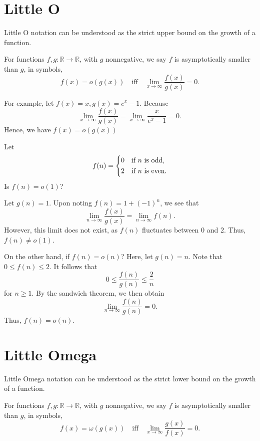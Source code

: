 \section{Little O}
Little O notation can be understood as the strict upper bound on the growth of a function.

\begin{definition}
    For functions \(f, g: \mathbb{R} \to \mathbb{R}\), with \(g\) nonnegative, we say \(f\) is asymptotically smaller than \(g\), in symbols,
    \[
        f(x) = o(g(x))\quad\text{iff}\quad\lim_{x \to \infty} \dfrac{f(x)}{g(x)} = 0. 
    \]
\end{definition}

\begin{eg}
    For example, let \(f(x) = x, g(x) = e^x - 1\). Because 
    \[
        \lim_{x \to \infty} \dfrac{f(x)}{g(x)} = \lim_{x \to \infty} \dfrac{x}{e^x - 1} = 0.
    \]
    Hence, we have \(f(x) = o(g(x))\) 
\end{eg}
\newpage
\begin{eg}
Let
\[
    f(n) = \begin{dcases}
        0\quad \text{if \(n\) is odd},\\
        2\quad \text{if \(n\) is even}.
    \end{dcases}
\]
Is \(f(n) = o(1)\)?

Let \(g(n) = 1\). Upon noting \(f(n) = 1 + (-1)^n\), we see that
\[
    \lim_{n \to \infty} \dfrac{f(x)}{g(x)} = \lim_{n \to \infty} f(n).
\] 
However, this limit does not exist, as \(f(n)\) fluctuates between 0 and 2. Thus, \(f(n) \neq o(1)\).

On the other hand, if \(f(n) = o(n)\)? Here, let \(g(n) = n\). Note that \(0 \leq f(n) \leq 2\). It follows that 
\[
    0 \leq \dfrac{f(n)}{g(n)} \leq \dfrac{2}{n}
\]
for \(n \geq 1\). By the sandwich theorem, we then obtain
\[
    \lim_{n \to \infty} \dfrac{f(n)}{g(n)} = 0.
\] 
Thus, \(f(n) = o(n)\).
\end{eg}

\section{Little Omega}
Little Omega notation can be understood as the strict lower bound on the growth of a function.

\begin{definition}
    For functions \(f, g: \mathbb{R} \to \mathbb{R}\), with \(g\) nonnegative, we say \(f\) is asymptotically smaller than \(g\), in symbols,
    \[
        f(x) = \omega (g(x))\quad\text{iff}\quad\lim_{x \to \infty} \dfrac{g(x)}{f(x)} = 0. 
    \]
\end{definition}

